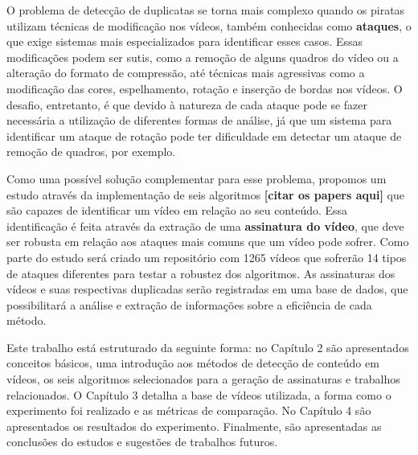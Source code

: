 
O problema de detecção de duplicatas se torna mais complexo quando os piratas utilizam técnicas de modificação nos vídeos, também conhecidas como \textbf{ataques}, o que exige sistemas mais especializados para identificar esses casos. Essas modificações podem ser sutis, como a remoção de alguns quadros do vídeo ou a alteração do formato de compressão, até técnicas mais agressivas como a modificação das cores, espelhamento, rotação e inserção de bordas nos vídeos. O desafio, entretanto, é que devido à natureza de cada ataque pode se fazer necessária a utilização de diferentes formas de análise, já que um sistema para identificar um ataque de rotação pode ter dificuldade em detectar um ataque de remoção de quadros, por exemplo. 

Como uma possível solução complementar para esse problema, propomos um estudo através da implementação de seis algoritmos \textbf{[citar os papers aqui]} que são capazes de identificar um vídeo em relação ao seu conteúdo. Essa identificação é feita através da extração de uma \textbf{assinatura do vídeo}, que deve ser robusta em relação aos ataques mais comuns que um vídeo pode sofrer. Como parte do estudo será criado um repositório com 1265 vídeos que sofrerão 14 tipos de ataques diferentes para testar a robustez dos algoritmos. As assinaturas dos vídeos e suas respectivas duplicadas serão registradas em  uma base de dados, que possibilitará a análise e extração de informações sobre a eficiência de cada método.



Este trabalho está estruturado da seguinte forma: no Capítulo 2 são apresentados conceitos básicos, uma introdução aos métodos de detecção de conteúdo em vídeos, os seis algoritmos selecionados para a geração de assinaturas e trabalhos relacionados. O Capítulo 3 detalha a base de vídeos utilizada, a forma como o experimento foi realizado e as métricas de comparação. No Capítulo 4 são apresentados os resultados do experimento. Finalmente, são apresentadas as conclusões do estudos e sugestões de trabalhos futuros.
    
